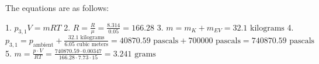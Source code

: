 The equations are as follows:

1. \( p_{3,1} V = mRT \)
2. \( R = \frac{R}{\mu} = \frac{8.314}{0.05} = 166.28 \)
3. \( m = m_K + m_{EV} = 32.1 \text{ kilograms} \)
4. \( p_{3,1} = p_{\text{ambient}} + \frac{32.1 \text{ kilograms}}{6.05 \text{ cubic meters}} = 40870.59 \text{ pascals} + 700000 \text{ pascals} = 740870.59 \text{ pascals} \)
5. \( m = \frac{p \cdot V}{RT} = \frac{740870.59 \cdot 0.00347}{166.28 \cdot 7.73 \cdot 15} = 3.241 \text{ grams} \)